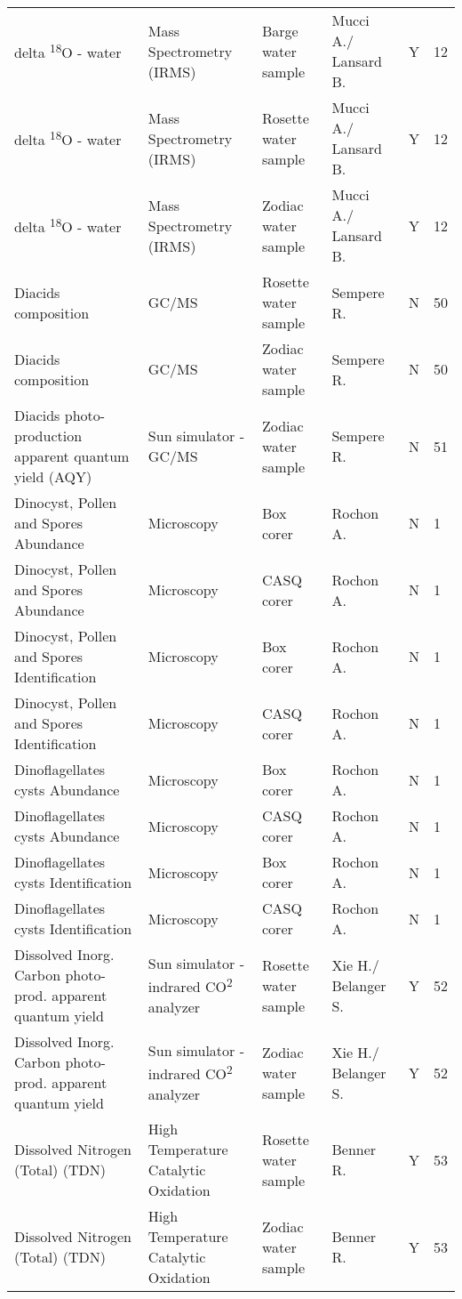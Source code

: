 \begin{ThreePartTable}
\begin{longtable}[t]{llllll}
delta \textsuperscript{18}O - water & Mass Spectrometry (IRMS) & Barge water sample & Mucci A./ Lansard B. & Y & 12\\
delta \textsuperscript{18}O - water & Mass Spectrometry (IRMS) & Rosette water sample & Mucci A./ Lansard B. & Y & 12\\
delta \textsuperscript{18}O - water & Mass Spectrometry (IRMS) & Zodiac water sample & Mucci A./ Lansard B. & Y & 12\\
\addlinespace
Diacids composition & GC/MS & Rosette water sample & Sempere R. & N & 50\\
Diacids composition & GC/MS & Zodiac water sample & Sempere R. & N & 50\\
Diacids photo-production apparent quantum yield (AQY) & Sun simulator - GC/MS & Zodiac water sample & Sempere R. & N & 51\\
Dinocyst, Pollen and Spores Abundance & Microscopy & Box corer & Rochon A. & N & 1\\
Dinocyst, Pollen and Spores Abundance & Microscopy & CASQ corer & Rochon A. & N & 1\\
\addlinespace
Dinocyst, Pollen and Spores Identification & Microscopy & Box corer & Rochon A. & N & 1\\
Dinocyst, Pollen and Spores Identification & Microscopy & CASQ corer & Rochon A. & N & 1\\
Dinoflagellates cysts Abundance & Microscopy & Box corer & Rochon A. & N & 1\\
Dinoflagellates cysts Abundance & Microscopy & CASQ corer & Rochon A. & N & 1\\
Dinoflagellates cysts Identification & Microscopy & Box corer & Rochon A. & N & 1\\
\addlinespace
Dinoflagellates cysts Identification & Microscopy & CASQ corer & Rochon A. & N & 1\\
Dissolved Inorg. Carbon photo-prod. apparent quantum yield & Sun simulator - indrared CO\textsuperscript{2} analyzer & Rosette water sample & Xie H./ Belanger S. & Y & 52\\
Dissolved Inorg. Carbon photo-prod. apparent quantum yield & Sun simulator - indrared CO\textsuperscript{2} analyzer & Zodiac water sample & Xie H./ Belanger S. & Y & 52\\
Dissolved Nitrogen (Total) (TDN) & High Temperature Catalytic Oxidation & Rosette water sample & Benner R. & Y & 53\\
Dissolved Nitrogen (Total) (TDN) & High Temperature Catalytic Oxidation & Zodiac water sample & Benner R. & Y & 53\\

\end{longtable}
\end{ThreePartTable}
